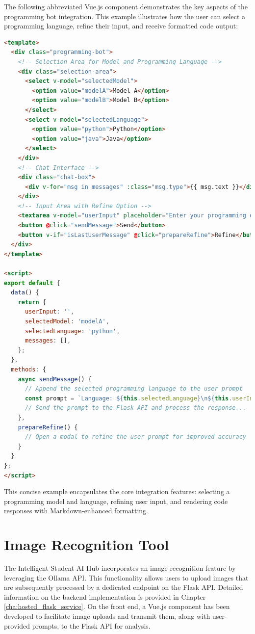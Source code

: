 The following abbreviated Vue.js component demonstrates the key aspects of the programming bot integration. This example illustrates how the user can select a programming language, refine their input, and receive formatted code output:

\begin{lstlisting}[language=html, caption={Abbreviated Vue.js Component for the Programming Bot}, frame=single]
<template>
  <div class="programming-bot">
    <!-- Selection Area for Model and Programming Language -->
    <div class="selection-area">
      <select v-model="selectedModel">
        <option value="modelA">Model A</option>
        <option value="modelB">Model B</option>
      </select>
      <select v-model="selectedLanguage">
        <option value="python">Python</option>
        <option value="java">Java</option>
      </select>
    </div>
    <!-- Chat Interface -->
    <div class="chat-box">
      <div v-for="msg in messages" :class="msg.type">{{ msg.text }}</div>
    </div>
    <!-- Input Area with Refine Option -->
    <textarea v-model="userInput" placeholder="Enter your programming question..."></textarea>
    <button @click="sendMessage">Send</button>
    <button v-if="isLastUserMessage" @click="prepareRefine">Refine</button>
  </div>
</template>

<script>
export default {
  data() {
    return {
      userInput: '',
      selectedModel: 'modelA',
      selectedLanguage: 'python',
      messages: [],
    };
  },
  methods: {
    async sendMessage() {
      // Append the selected programming language to the user prompt
      const prompt = `Language: ${this.selectedLanguage}\n${this.userInput}`;
      // Send the prompt to the Flask API and process the response...
    },
    prepareRefine() {
      // Open a modal to refine the user prompt for improved accuracy
    }
  }
};
</script>
\end{lstlisting}

This concise example encapsulates the core integration features: selecting a programming model and language, refining user input, 
and rendering code responses with Markdown-enhanced formatting.

\section{Image Recognition Tool}

The Intelligent Student AI Hub incorporates an image recognition feature by leveraging the Ollama API. 
This functionality allows users to upload images that are subsequently processed by a dedicated endpoint on the Flask API. 
Detailed information on the backend implementation is provided in Chapter \ref{cha:hosted_flask_service}. 
On the front end, a Vue.js component has been developed to facilitate image uploads and transmit them, along with user-provided prompts, to the Flask API for analysis.

